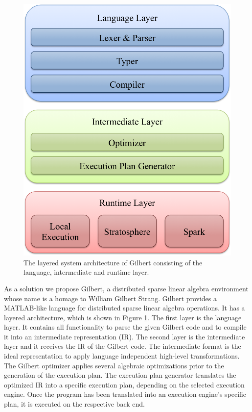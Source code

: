 \begin{figure}[t!]
\centering
\includegraphics[height=0.175\paperheight]{images/systemArchitecture.png}
\caption{The layered system architecture of Gilbert consisting of the language, intermediate and runtime layer.}
\label{fig:systemArchitecture}
\end{figure}

As a solution we propose Gilbert, a distributed sparse linear algebra environment whose name is a homage to William Gilbert Strang.
Gilbert provides a MATLAB-like language for distributed sparse linear algebra operations. It has a layered architecture, which is shown in Figure \ref{fig:systemArchitecture}. The first layer is the language layer. It contains all functionality to parse the given Gilbert code and to compile it into an intermediate representation (IR). The second layer is the intermediate layer and it receives the IR of the Gilbert code. The intermediate format is the ideal representation to apply language independent high-level transformations. The Gilbert optimizer applies several algebraic optimizations prior to the generation of the execution plan. The execution plan generator translates the optimized IR into a specific execution plan, depending on the selected execution engine. Once the program has been translated into an execution engine's specific plan, it is executed on the respective back end. 

